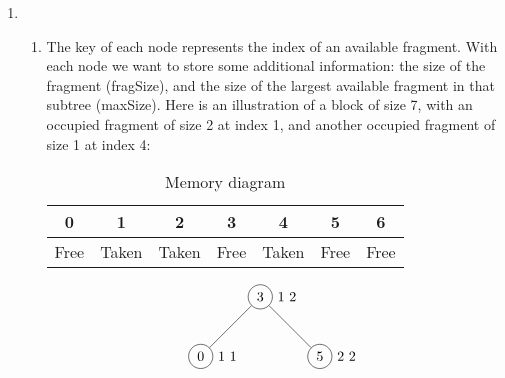 \documentclass[11pt]{article}
\begin{document}
\begin{enumerate}
\begin{enumerate}[a)]
			\end{enumerate}
	
		\item %
			\begin{enumerate}
				\item
				The key of each node represents the index of an available fragment. With each node we want to store some additional information:  the size of the fragment (fragSize), and the size of the largest available fragment in that subtree (maxSize). Here is an illustration of a block of size 7, with an occupied fragment of size 2 at index 1, and another occupied fragment of size 1 at index 4:
				
				\begin{table}[ht]
					\caption{Memory diagram} %
					\centering  %
					\begin{tabular}{c c c c c c c} %
					\hline\hline                        %
					0 & 1 & 2 & 3 & 4 & 5 & 6\\ [0.5ex] %
					\hline                  %
					Free & Taken & Taken & Free & Taken & Free & Free  \\ %
					\hline %
					\end{tabular}
					\label{table:nonlin} %
				\end{table}

				$$
				\begin{tikzpicture}[level/.style={sibling distance=30mm/#1}]
					\node [circle,draw,label=0:1 2] {$3$} {
						child {node [circle,draw,label=0:1 1] {$0$}}
					    child {node [circle,draw,label=0: 2 2] {$5$}}   
				    };
				\end{tikzpicture}
				$$


\end{enumerate}
\end{enumerate}
\end{document}
